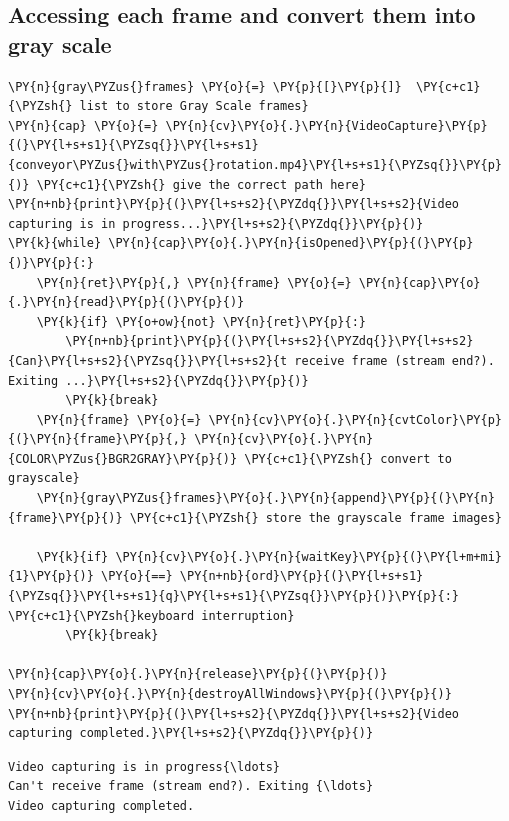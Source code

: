 \documentclass[a4paper,11pt]{article}%
\begin{document}
\subsection{Accessing each frame and convert them into gray scale}
    \begin{tcolorbox}[breakable, size=fbox, boxrule=1pt, pad at break*=1mm,colback=cellbackground, colframe=cellborder]
\begin{Verbatim}[commandchars=\\\{\}]
\PY{n}{gray\PYZus{}frames} \PY{o}{=} \PY{p}{[}\PY{p}{]}  \PY{c+c1}{\PYZsh{} list to store Gray Scale frames}
\PY{n}{cap} \PY{o}{=} \PY{n}{cv}\PY{o}{.}\PY{n}{VideoCapture}\PY{p}{(}\PY{l+s+s1}{\PYZsq{}}\PY{l+s+s1}{conveyor\PYZus{}with\PYZus{}rotation.mp4}\PY{l+s+s1}{\PYZsq{}}\PY{p}{)} \PY{c+c1}{\PYZsh{} give the correct path here}
\PY{n+nb}{print}\PY{p}{(}\PY{l+s+s2}{\PYZdq{}}\PY{l+s+s2}{Video capturing is in progress...}\PY{l+s+s2}{\PYZdq{}}\PY{p}{)}
\PY{k}{while} \PY{n}{cap}\PY{o}{.}\PY{n}{isOpened}\PY{p}{(}\PY{p}{)}\PY{p}{:}
    \PY{n}{ret}\PY{p}{,} \PY{n}{frame} \PY{o}{=} \PY{n}{cap}\PY{o}{.}\PY{n}{read}\PY{p}{(}\PY{p}{)}
    \PY{k}{if} \PY{o+ow}{not} \PY{n}{ret}\PY{p}{:}
        \PY{n+nb}{print}\PY{p}{(}\PY{l+s+s2}{\PYZdq{}}\PY{l+s+s2}{Can}\PY{l+s+s2}{\PYZsq{}}\PY{l+s+s2}{t receive frame (stream end?). Exiting ...}\PY{l+s+s2}{\PYZdq{}}\PY{p}{)}
        \PY{k}{break}
    \PY{n}{frame} \PY{o}{=} \PY{n}{cv}\PY{o}{.}\PY{n}{cvtColor}\PY{p}{(}\PY{n}{frame}\PY{p}{,} \PY{n}{cv}\PY{o}{.}\PY{n}{COLOR\PYZus{}BGR2GRAY}\PY{p}{)} \PY{c+c1}{\PYZsh{} convert to grayscale}
    \PY{n}{gray\PYZus{}frames}\PY{o}{.}\PY{n}{append}\PY{p}{(}\PY{n}{frame}\PY{p}{)} \PY{c+c1}{\PYZsh{} store the grayscale frame images}

    \PY{k}{if} \PY{n}{cv}\PY{o}{.}\PY{n}{waitKey}\PY{p}{(}\PY{l+m+mi}{1}\PY{p}{)} \PY{o}{==} \PY{n+nb}{ord}\PY{p}{(}\PY{l+s+s1}{\PYZsq{}}\PY{l+s+s1}{q}\PY{l+s+s1}{\PYZsq{}}\PY{p}{)}\PY{p}{:} \PY{c+c1}{\PYZsh{}keyboard interruption}
        \PY{k}{break}

\PY{n}{cap}\PY{o}{.}\PY{n}{release}\PY{p}{(}\PY{p}{)}
\PY{n}{cv}\PY{o}{.}\PY{n}{destroyAllWindows}\PY{p}{(}\PY{p}{)}
\PY{n+nb}{print}\PY{p}{(}\PY{l+s+s2}{\PYZdq{}}\PY{l+s+s2}{Video capturing completed.}\PY{l+s+s2}{\PYZdq{}}\PY{p}{)}
\end{Verbatim}
\end{tcolorbox}

    \begin{Verbatim}[commandchars=\\\{\}]
Video capturing is in progress{\ldots}
Can't receive frame (stream end?). Exiting {\ldots}
Video capturing completed.
    \end{Verbatim}
\end{document}
